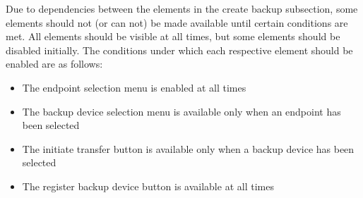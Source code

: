 Due to dependencies between the elements in the create backup subsection, some elements
should not (or can not) be made available until certain conditions are met. All elements 
should be visible at all times, but some elements should be disabled initially. The 
conditions under which each respective element should be enabled are as follows:

\begin{itemize}\itemsep1pt
  \item The endpoint selection menu is enabled at all times
  \item The backup device selection menu is available only when an endpoint has been
  selected
  \item The initiate transfer button is available only when a backup device has been
  selected
  \item The register backup device button is available at all times 
\end{itemize}


